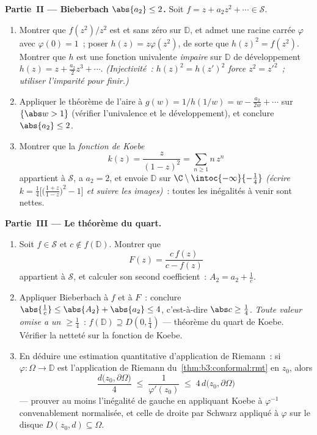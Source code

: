 \begin{problem}
\medskip
\noindent\textbf{Partie~II --- Bieberbach $\abs{a_2} \leq
2$.} Soit $f = z + a_2z^2 + \cdots \in \mathcal S$.
\begin{enumerate}[resume]
  \item Montrer que $f(z^2)/z^2$ est  et sans zéro
        sur $\mathbb D$, et admet une racine carrée
         $\varphi$ avec $\varphi(0) = 1$~; poser
        $h(z) = z\varphi(z^2)$, de sorte que $h(z)^2 =
        f(z^2)$. Montrer que $h$ est une fonction univalente
        \emph{impaire} sur $\mathbb D$ de développement $h(z)
        = z + \frac{a_2}2z^3 + \cdots$. \emph{(Injectivité~:
        $h(z)^2 = h(z')^2$ force $z^2 = z'^2$~; utiliser
        l'imparité pour finir.)}
  \item Appliquer le théorème de l'aire à $g(w) = 1/h(1/w) =
        w - \frac{a_2}{2w} + \cdots$ sur $\{\abs w > 1\}$
        (vérifier l'univalence et le développement), et
        conclure $\abs{a_2} \leq 2$.
  \item Montrer que la \emph{fonction de Koebe}
        \[
        k(z) = \frac{z}{(1 - z)^2} = \sum_{n\geq1}n\,z^n
        \]
        appartient à $\mathcal S$, a $a_2 = 2$, et envoie
        $\mathbb D$ sur $\C\setminus\intoc{-\infty}{-\frac14}$
        \emph{(écrire $k = \frac14\bigl[\bigl(\frac{1+z}{1 -
        z}\bigr)^2 - 1\bigr]$ et suivre les images)}~:
        toutes les inégalités à venir sont nettes.
\end{enumerate}

\medskip
\noindent\textbf{Partie~III --- Le théorème du quart.}
\begin{enumerate}[resume]
  \item Soit $f \in \mathcal S$ et $c \notin f(\mathbb D)$.
        Montrer que
        \[
        F(z) = \frac{c\,f(z)}{c - f(z)}
        \]
        appartient à $\mathcal S$, et calculer son second
        coefficient~: $A_2 = a_2 + \frac1c$.
  \item Appliquer Bieberbach à $f$ et à $F$~: conclure
        $\abs{\frac1c} \leq \abs{A_2} + \abs{a_2} \leq 4$,
        c'est-à-dire $\abs c \geq \frac14$. \emph{Toute
        valeur omise a un  $\geq \frac14$}~:
        $f(\mathbb D) \supseteq D(0, \frac14)$ --- théorème
        du quart de Koebe. Vérifier la netteté sur la
        fonction de Koebe.
  \item En déduire une estimation quantitative d'application
        de Riemann~: si $\varphi \colon \Omega \to \mathbb
        D$ est l'application de Riemann
        du~\cref{thm:b3:conformal:rmt} en $z_0$, alors
        \[
        \frac{d\bigl(z_0, \partial\Omega\bigr)}{4}
        \;\leq\; \frac1{\varphi'(z_0)} \;\leq\;
        4\,d\bigl(z_0, \partial\Omega\bigr)
        \]
        --- prouver au moins l'inégalité de gauche en
        appliquant Koebe à $\varphi^{-1}$ convenablement
        normalisée, et celle de droite par Schwarz appliqué
        à $\varphi$ sur le disque $D(z_0, d) \subseteq
        \Omega$.
\end{enumerate}


\end{problem}
